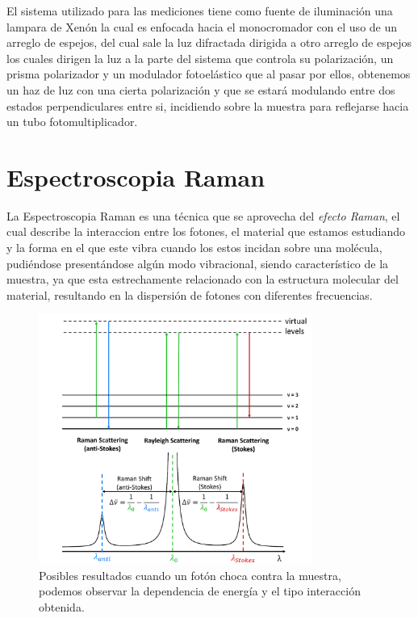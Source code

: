 El sistema utilizado para las mediciones tiene como fuente de iluminación una lampara de Xenón la cual es enfocada hacia el monocromador con el uso de un arreglo de espejos, del cual sale la luz difractada dirigida a otro arreglo de espejos los cuales dirigen la luz a la parte del sistema que controla su polarización, un prisma polarizador y un modulador fotoelástico que al pasar por ellos, obtenemos un haz de luz con una cierta polarización y que se estará modulando entre dos estados perpendiculares entre si, incidiendo sobre la muestra para reflejarse hacia un tubo fotomultiplicador.\cite{LastrasMartnez1993}

\section{Espectroscopia Raman}
\label{sec:chap3-raman}
La Espectroscopia Raman es una técnica que se aprovecha del \textit{efecto Raman}, el cual describe la interaccion entre los fotones, el material que estamos estudiando y la forma en el que este vibra cuando los estos incidan sobre una molécula, pudiéndose presentándose algún modo vibracional, siendo característico de la muestra, ya que esta estrechamente relacionado con la estructura molecular del material, resultando en la dispersión de fotones con diferentes frecuencias.\cite{Prasankumar2016}

\begin{figure}[h!]
    \centering
    \includegraphics[width=0.8\textwidth]{figures/chap3/raman-ray-stokes-antistokes.png}
        \caption{Posibles resultados cuando un fotón choca contra la muestra, podemos observar la 
        dependencia de energía y el tipo interacción obtenida.}
    \label{fig:raman_diagram}
\end{figure}

